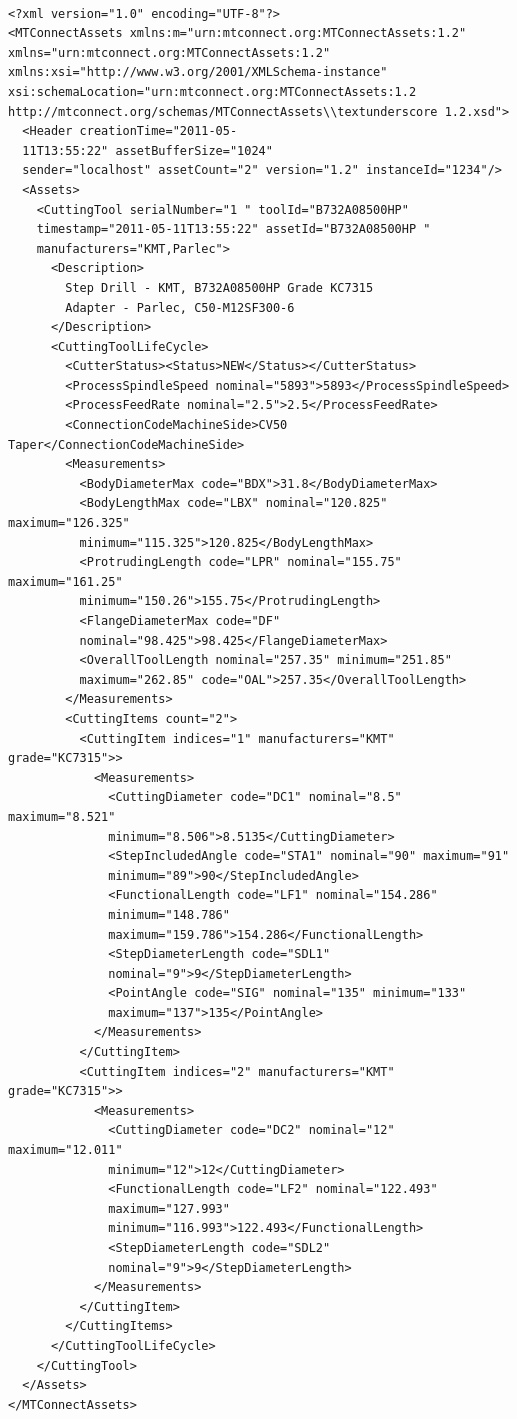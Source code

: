 	\begin{lstlisting}[firstnumber=1,escapechar=|,% 
	caption={Example for Step Mill Side View}, label={lst:Example for Step Mill Side View}]
	
<?xml version="1.0" encoding="UTF-8"?>
<MTConnectAssets xmlns:m="urn:mtconnect.org:MTConnectAssets:1.2" 
xmlns="urn:mtconnect.org:MTConnectAssets:1.2" 
xmlns:xsi="http://www.w3.org/2001/XMLSchema-instance" 
xsi:schemaLocation="urn:mtconnect.org:MTConnectAssets:1.2 
http://mtconnect.org/schemas/MTConnectAssets\\textunderscore 1.2.xsd">
  <Header creationTime="2011-05-
  11T13:55:22" assetBufferSize="1024" 
  sender="localhost" assetCount="2" version="1.2" instanceId="1234"/>
  <Assets>
    <CuttingTool serialNumber="1 " toolId="B732A08500HP" 
    timestamp="2011-05-11T13:55:22" assetId="B732A08500HP " 
    manufacturers="KMT,Parlec">
      <Description>
        Step Drill - KMT, B732A08500HP Grade KC7315
        Adapter - Parlec, C50-M12SF300-6
      </Description>
      <CuttingToolLifeCycle>
        <CutterStatus><Status>NEW</Status></CutterStatus>
        <ProcessSpindleSpeed nominal="5893">5893</ProcessSpindleSpeed>
        <ProcessFeedRate nominal="2.5">2.5</ProcessFeedRate>
        <ConnectionCodeMachineSide>CV50 Taper</ConnectionCodeMachineSide>
        <Measurements>
          <BodyDiameterMax code="BDX">31.8</BodyDiameterMax>
          <BodyLengthMax code="LBX" nominal="120.825" maximum="126.325" 
          minimum="115.325">120.825</BodyLengthMax>
          <ProtrudingLength code="LPR" nominal="155.75" maximum="161.25" 
          minimum="150.26">155.75</ProtrudingLength>
          <FlangeDiameterMax code="DF" 
          nominal="98.425">98.425</FlangeDiameterMax>
          <OverallToolLength nominal="257.35" minimum="251.85" 
          maximum="262.85" code="OAL">257.35</OverallToolLength>
        </Measurements>
        <CuttingItems count="2">
          <CuttingItem indices="1" manufacturers="KMT" grade="KC7315">>
            <Measurements>
              <CuttingDiameter code="DC1" nominal="8.5" maximum="8.521" 
              minimum="8.506">8.5135</CuttingDiameter>
              <StepIncludedAngle code="STA1" nominal="90" maximum="91" 
              minimum="89">90</StepIncludedAngle>
              <FunctionalLength code="LF1" nominal="154.286" 
              minimum="148.786" 
              maximum="159.786">154.286</FunctionalLength>
              <StepDiameterLength code="SDL1" 
              nominal="9">9</StepDiameterLength>
              <PointAngle code="SIG" nominal="135" minimum="133" 
              maximum="137">135</PointAngle>
            </Measurements>
          </CuttingItem>
          <CuttingItem indices="2" manufacturers="KMT" grade="KC7315">>
            <Measurements>
              <CuttingDiameter code="DC2" nominal="12" maximum="12.011" 
              minimum="12">12</CuttingDiameter>
              <FunctionalLength code="LF2" nominal="122.493" 
              maximum="127.993" 
              minimum="116.993">122.493</FunctionalLength>
              <StepDiameterLength code="SDL2" 
              nominal="9">9</StepDiameterLength>
            </Measurements>
          </CuttingItem>
        </CuttingItems>
      </CuttingToolLifeCycle>
    </CuttingTool>
  </Assets>
</MTConnectAssets>


\end{lstlisting}

